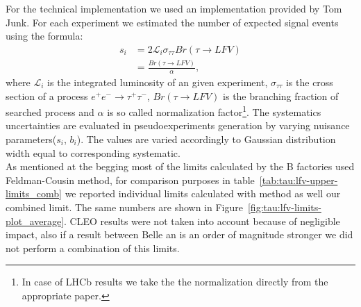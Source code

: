 For the technical implementation we used an implementation provided by Tom Junk\cite{tjunk}. For each experiment we estimated the number of expected signal events using the formula:
\begin{equation}
\begin{split}
s_i & =2\mathcal{L}_i\sigma_{\tau\tau}Br(\tau \rightarrow LFV) \\
& =\frac{Br(\tau \rightarrow LFV)}{\alpha},
\end{split}
\end{equation}
where $\mathcal{L}_i$ is the integrated luminosity of an given experiment, $\sigma_{\tau\tau}$ is the cross section of a process $e^+ e^- \rightarrow  \tau^+ \tau^-$, $Br(\tau \rightarrow LFV)$ is the branching fraction of searched process and $\alpha$ is so called normalization factor\footnote{In case of LHCb results we take the the normalization directly from the appropriate paper.}. The systematics uncertainties are evaluated in pseudoexperiments generation by varying nuisance parameters($s_i$, $b_i$). The values are varied accordingly to Gaussian distribution width equal to corresponding systematic.\\
As mentioned at the begging most of the limits calculated by the B factories used Feldman-Cousin method, for comparison purposes in table~\ref{tab:tau:lfv-upper-limits_comb} we reported individual limits calculated with \cls method as well our combined limit. The same numbers are shown in Figure~\ref{fig:tau:lfv-limits-plot_average}. CLEO results were not taken into account because of negligible impact, also if a result between Belle an \babar is an order of magnitude stronger we did not perform a combination of this limits.



